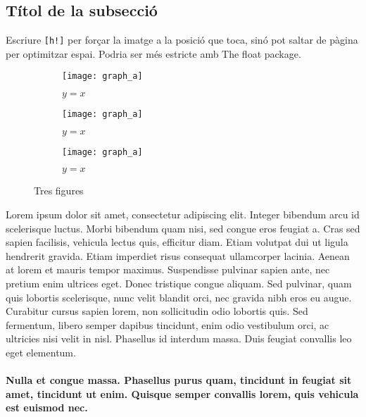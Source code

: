 \subsection{Títol de la subsecció}
Escriure \verb|[h!]| per forçar la imatge a la posició que toca, sinó pot saltar de pàgina per optimitzar espai. Podria ser més estricte amb The float package.
\begin{figure}[h!]
	\centering
	\begin{subfigure}[b]{0.3\textwidth}
	\centering
	\texttt{[image: graph\_a]}
	\caption{$y=x$}
	\label{fig: y equals x}
	\end{subfigure}
	\hfill
	\begin{subfigure}[b]{0.3\textwidth}
	\centering
	\texttt{[image: graph\_a]}
	\caption{$y=x$}
	\label{fig: y equals x}
	\end{subfigure}
	\hfill
	\begin{subfigure}[b]{0.3\textwidth}
	\centering
	\texttt{[image: graph\_a]}
	\caption{$y=x$}
	\label{fig: y equals x}
	\end{subfigure}
	\caption{Tres figures}
	\label{fig:three_graphs}
\end{figure}
Lorem ipsum dolor sit amet, consectetur adipiscing elit. Integer bibendum arcu id scelerisque luctus. Morbi bibendum quam nisi, sed congue eros feugiat a. Cras sed sapien facilisis, vehicula lectus quis, efficitur diam. Etiam volutpat dui ut ligula hendrerit gravida. Etiam imperdiet risus consequat ullamcorper lacinia. Aenean at lorem et mauris tempor maximus. Suspendisse pulvinar sapien ante, nec pretium enim ultrices eget. Donec tristique congue aliquam. Sed pulvinar, quam quis lobortis scelerisque, nunc velit blandit orci, nec gravida nibh eros eu augue. Curabitur cursus sapien lorem, non sollicitudin odio lobortis quis. Sed fermentum, libero semper dapibus tincidunt, enim odio vestibulum orci, ac ultricies nisi velit in nisl. Phasellus id interdum massa. Duis feugiat convallis leo eget elementum.
\paragraph{Nulla et congue massa. Phasellus purus quam, tincidunt in feugiat sit amet, tincidunt ut enim. Quisque semper convallis lorem, quis vehicula est euismod nec.}
